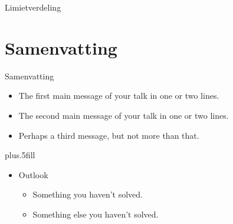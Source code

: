 \documentclass{beamer}
\begin{document}
\begin{frame}{Limietverdeling}
  \begin{center}





  \end{center}
\end{frame}


\section*{Samenvatting}

\begin{frame}{Samenvatting}

  \begin{itemize}
  \item
    The \alert{first main message} of your talk in one or two lines.
  \item
    The \alert{second main message} of your talk in one or two lines.
  \item
    Perhaps a \alert{third message}, but not more than that.
  \end{itemize}

  \vskip0pt plus.5fill
  \begin{itemize}
  \item
    Outlook
    \begin{itemize}
    \item
      Something you haven't solved.
    \item
      Something else you haven't solved.
    \end{itemize}
  \end{itemize}
\end{frame}
\end{document}
